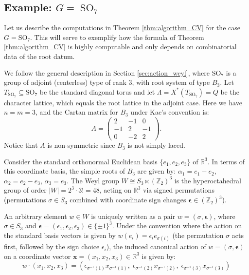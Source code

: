 \documentclass[11pt,english]{amsart}
\numberwithin{equation}{section}
\numberwithin{figure}{section}
\theoremstyle{plain}
\theoremstyle{plain}
\theoremstyle{definition}
\theoremstyle{remark}
\newcommand{\SO}{\operatorname{SO}}
\begin{document}
\subsection{Example: $G=\SO_7$}
\label{ssec:SO7}

Let us describe the computations in Theorem \ref{thm:algorithm_CV} for the case $G=\mathrm{SO}_7$. This will serve to exemplify how the formula of Theorem \ref{thm:algorithm_CV} is highly computable and only depends on combinatorial data of the root datum.

We follow the general description in Section \ref{sec:action_weyl}, where $\mathrm{SO}_7$ is a group of adjoint (centerless) type of rank $3$, with root system of type $B_3$. Let $T_{\SO_7} \subseteq \mathrm{SO}_7$ be the standard diagonal torus and let $\Lambda = X^*(T_{\SO_7}) = Q$ be the character lattice, which equals the root lattice in the adjoint case. Here we have $n=m=3$, and the Cartan matrix for $B_3$ under Kac's convention \cite{Kac1990} is:
\[
A = \begin{pmatrix} 2 & -1 & 0 \\ -1 & 2 & -1 \\ 0 & -2 & 2 \end{pmatrix}.
\]
Notice that $A$ is non-symmetric since $B_3$ is not simply laced.

Consider the standard orthonormal Euclidean basis $\{e_1, e_2, e_3\}$ of $\mathbb{R}^3$. In terms of this coordinate basis, the simple roots of $B_3$ are given by:
$
\alpha_1 = e_1 - e_2$, $\alpha_2 = e_2 - e_3$, $\alpha_3 = e_3$.
The Weyl group $W \cong S_3 \ltimes (\mathbb{Z}_2)^3$ is the hyperoctahedral group of order $|W| = 2^3 \cdot 3! = 48$, acting on $\mathbb{R}^3$ via signed permutations (permutations $\sigma \in S_3$ combined with coordinate sign changes $\boldsymbol{\epsilon} \in (\mathbb{Z}_2)^3$). 

An arbitrary element $w \in W$ is uniquely written as a pair $w = (\sigma, \boldsymbol{\epsilon})$, where $\sigma \in S_3$ and $\boldsymbol{\epsilon} = (\epsilon_1, \epsilon_2, \epsilon_3) \in \{\pm 1\}^3$. Under the convention where the action on the standard basis vectors is given by $w(e_i) = \epsilon_i e_{\sigma(i)}$ (the permutation $\sigma$ acts first, followed by the sign choice $\epsilon_i$), the induced canonical action of $w = (\sigma, \boldsymbol{\epsilon})$ on a coordinate vector $\mathbf{x} = (x_1, x_2, x_3) \in \mathbb{R}^3$ is given by:
\begin{equation*}
w \cdot (x_1, x_2, x_3) = \left( \epsilon_{\sigma^{-1}(1)} x_{\sigma^{-1}(1)}, \; \epsilon_{\sigma^{-1}(2)} x_{\sigma^{-1}(2)}, \; \epsilon_{\sigma^{-1}(3)} x_{\sigma^{-1}(3)} \right)
\end{equation*}
\end{document}
